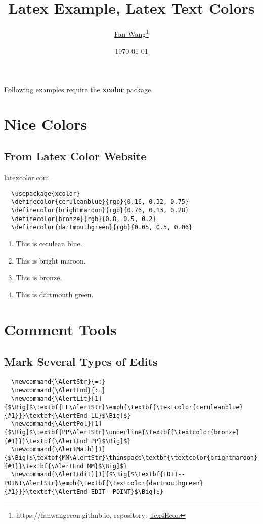 \documentclass[12pt,english]{article}
\title{Latex Example, Latex Text Colors}
\author{\href{https://fanwangecon.github.io/}{Fan Wang}\thanks{https://fanwangecon.github.io, repository: \href{https://fanwangecon.github.io/Tex4Econ/}{Tex4Econ}}}
\date{\today}
\begin{document}
\maketitle

Following examples require the \textbf{xcolor} package.

\section{Nice Colors}
\subsection{From Latex Color Website}
\href{http://latexcolor.com/}{latexcolor.com}
\begin{lstlisting}
  \usepackage{xcolor}
  \definecolor{ceruleanblue}{rgb}{0.16, 0.32, 0.75}
  \definecolor{brightmaroon}{rgb}{0.76, 0.13, 0.28}
  \definecolor{bronze}{rgb}{0.8, 0.5, 0.2}
  \definecolor{dartmouthgreen}{rgb}{0.05, 0.5, 0.06}
\end{lstlisting}

\begin{enumerate}
  \item \textcolor{ceruleanblue}{This is cerulean blue.}
  \item \textcolor{brightmaroon}{This is bright maroon.}
  \item \textcolor{bronze}{This is bronze.}
  \item \textcolor{dartmouthgreen}{This is dartmouth green.}
\end{enumerate}

\section{Comment Tools}
\subsection{Mark Several Types of Edits}
\begin{lstlisting}
  \newcommand{\AlertStr}{=:}
  \newcommand{\AlertEnd}{:=}
  \newcommand{\AlertLit}[1]{$\Big[$\textbf{LL\AlertStr}\emph{\textbf{\textcolor{ceruleanblue}{#1}}}\textbf{\AlertEnd LL}$\Big]$}
  \newcommand{\AlertPol}[1]{$\Big[$\textbf{PP\AlertStr}\underline{\textbf{\textcolor{bronze}{#1}}}\textbf{\AlertEnd PP}$\Big]$}
  \newcommand{\AlertMath}[1]{$\Big[$\textbf{MM\AlertStr}\thinspace\textbf{\textcolor{brightmaroon}{#1}}\textbf{\AlertEnd MM}$\Big]$}
  \newcommand{\AlertEdit}[1]{$\Big[$\textbf{EDIT--POINT\AlertStr}\emph{\textbf{\textcolor{dartmouthgreen}{#1}}}\textbf{\AlertEnd EDIT--POINT}$\Big]$}
\end{lstlisting}
\end{document}
